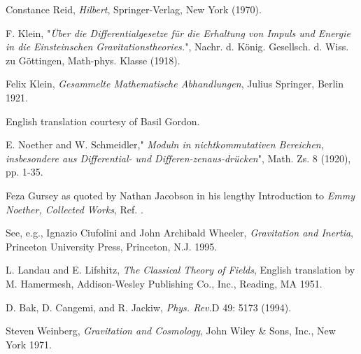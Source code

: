\documentclass[12pt]{article}
\begin{document}
\begin{thebibliography}{99}
 Constance Reid, {\it{Hilbert}}, Springer-Verlag, New York
(1970).


    

  F. Klein, "{\it{\"{U}ber die Differentialgesetze f\"{u}r
die Erhaltung von Impuls und Energie in die Einsteinschen
Gravitationstheories.}}", Nachr. d. K\"{o}nig. Gesellsch. d.
Wiss. zu G\"{o}ttingen, Math-phys. Klasse (1918).



 Felix Klein, {\it{Gesammelte Mathematische Abhandlungen}},
Julius Springer, Berlin 1921.

English translation 
courtesy of Basil Gordon.


E. Noether and W. Schmeidler," {\it{Moduln in nichtkommutativen Bereichen,
 insbesondere aus Differential-
  und Differen-zenaus-dr\"ucken}}", Math.
 Zs. 8 (1920), pp. 1-35.

 Feza Gursey as quoted by Nathan Jacobson in his lengthy Introduction to {\it{Emmy Noether, Collected Works}},
Ref. \cite{publist}.

 See, e.g., Ignazio Ciufolini and John Archibald Wheeler,{\it{
Gravitation and Inertia}}, Princeton University Press, Princeton, N.J.
1995.

 
 L. Landau and E. Lifshitz, {\it{The Classical Theory of Fields}},
English translation by M. Hamermesh, Addison-Wesley Publishing Co., Inc.,
Reading, MA 1951. 


 D. Bak, D. Cangemi, and R. Jackiw, {\it{Phys. Rev.}}D 49: 5173
(1994).

 Steven Weinberg, {\it{Gravitation and Cosmology}}, John Wiley \& 
Sons, Inc., New York 1971.

\end{thebibliography}
\end{document}
